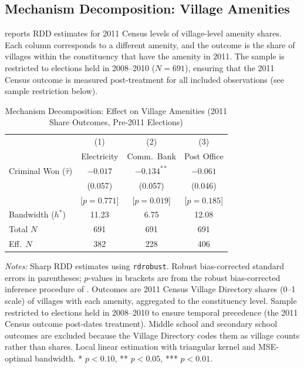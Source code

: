 \documentclass[12pt]{article}
\begin{document}
\subsection{Mechanism Decomposition: Village Amenities}

 reports RDD estimates for 2011 Census levels of village-level amenity shares. Each column corresponds to a different amenity, and the outcome is the share of villages within the constituency that have the amenity in 2011. The sample is restricted to elections held in 2008--2010 ($N = 691$), ensuring that the 2011 Census outcome is measured post-treatment for all included observations (see sample restriction below).

\begin{table}[H]
\centering
\caption{Mechanism Decomposition: Effect on Village Amenities (2011 Share Outcomes, Pre-2011 Elections)}
\label{tab:mechanisms}
\begin{threeparttable}
\begin{tabular}{lccc}
\toprule
 & (1) & (2) & (3) \\
 & Electricity & Comm.\ Bank & Post Office \\
\midrule
Criminal Won ($\hat{\tau}$) & $-0.017$ & $-0.134^{**}$ & $-0.061$ \\
 & (0.057) & (0.057) & (0.046) \\
 & [$p=0.771$] & [$p=0.019$] & [$p=0.185$] \\[6pt]
Bandwidth ($h^*$) & 11.23 & 6.75 & 12.08 \\
Total $N$ & 691 & 691 & 691 \\
Eff.\ $N$ & 382 & 228 & 406 \\
\bottomrule
\end{tabular}
\begin{tablenotes}[flushleft]
\small
\item \textit{Notes:} Sharp RDD estimates using \texttt{rdrobust}. Robust bias-corrected standard errors in parentheses; $p$-values in brackets are from the robust bias-corrected inference procedure of \citet{calonico2014}. Outcomes are 2011 Census Village Directory shares (0--1 scale) of villages with each amenity, aggregated to the constituency level. Sample restricted to elections held in 2008--2010 to ensure temporal precedence (the 2011 Census outcome post-dates treatment). Middle school and secondary school outcomes are excluded because the Village Directory codes them as village counts rather than shares. Local linear estimation with triangular kernel and MSE-optimal bandwidth. * $p<0.10$, ** $p<0.05$, *** $p<0.01$.
\end{tablenotes}
\end{threeparttable}
\end{table}
\end{document}
